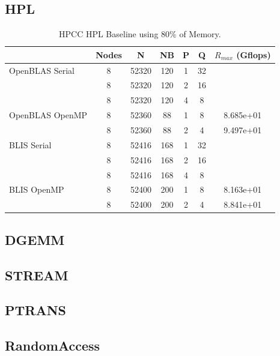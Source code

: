 \documentclass{report}
\begin{document}
%
%
\subsection{HPL}

\begin{table}[H]
\begin{center}
\begin{tabular}{ |l|c|c|c|c|c|c| } 
\hline
                & Nodes & N & NB & P & Q & $R_{max}$ (Gflops) \\ 
\hline
OpenBLAS Serial & 8 & 52320 & 120 & 1 & 32 & \\ 
                & 8 & 52320 & 120 & 2 & 16 & \\ 
                & 8 & 52320 & 120 & 4 & 8  & \\ 
\hline
OpenBLAS OpenMP & 8 & 52360 &  88 & 1 & 8  & 8.685e+01 \\ 
                & 8 & 52360 &  88 & 2 & 4  & 9.497e+01 \\ 
\hline
BLIS Serial     & 8 & 52416 & 168 & 1 & 32 & \\ 
                & 8 & 52416 & 168 & 2 & 16 & \\ 
                & 8 & 52416 & 168 & 4 & 8  & \\ 
\hline
BLIS OpenMP     & 8 & 52400 & 200 & 1 & 8  & 8.163e+01 \\ 
                & 8 & 52400 & 200 & 2 & 4  & 8.841e+01 \\ 
\hline
\end{tabular}
\end{center}
\caption{\label{tab:table-name}HPCC HPL Baseline using 80\% of Memory.}
\end{table}



%
%
\subsection{DGEMM}

 
%
%
\subsection{STREAM}


%
%
\subsection{PTRANS}


%
%
\subsection{RandomAccess}
\end{document}
